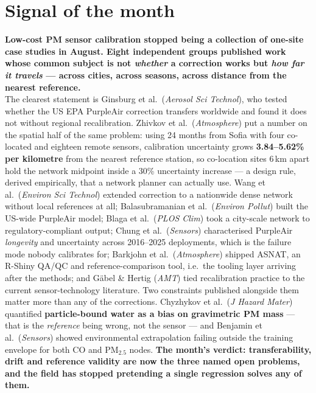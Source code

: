 \documentclass[10pt]{article}
\begin{document}
\vspace{6mm}

\section*{\sffamily\bfseries\color{Deep}Signal of the month}
\vspace{-1.5mm}{\color{Coral}\rule{\linewidth}{1.1pt}}\vspace{2.5mm}

\begin{keybox}
{\sffamily\bfseries\small\color{Deep}Low-cost PM sensor calibration stopped being a
collection of one-site case studies in August. Eight independent groups published work
whose common subject is not \emph{whether} a correction works but \emph{how far it
travels} --- across cities, across seasons, across distance from the nearest
reference.}\\[1.4mm]
\footnotesize
The clearest statement is Ginsburg et al.\ (\textit{Aerosol Sci Technol}), who tested
whether the US EPA PurpleAir correction transfers worldwide and found it does not
without regional recalibration. Zhivkov et al.\ (\textit{Atmosphere}) put a number on the
spatial half of the same problem: using 24 months from Sofia with four co-located and
eighteen remote sensors, calibration uncertainty grows \textbf{3.84--5.62\% per kilometre}
from the nearest reference station, so co-location sites 6\,km apart hold the network
midpoint inside a 30\% uncertainty increase --- a design rule, derived empirically, that a
network planner can actually use. Wang et al.\ (\textit{Environ Sci Technol}) extended
correction to a nationwide dense network without local references at all; Balasubramanian
et al.\ (\textit{Environ Pollut}) built the US-wide PurpleAir model; Blaga et al.\
(\textit{PLOS Clim}) took a city-scale network to regulatory-compliant output; Chung
et al.\ (\textit{Sensors}) characterised PurpleAir \emph{longevity} and uncertainty across
2016--2025 deployments, which is the failure mode nobody calibrates for; Barkjohn et al.\
(\textit{Atmosphere}) shipped ASNAT, an R-Shiny QA/QC and reference-comparison tool, i.e.\
the tooling layer arriving after the methods; and G\"abel \& Hertig (\textit{AMT}) tied
recalibration practice to the current sensor-technology literature.
Two constraints published alongside them matter more than any of the corrections.
Chyzhykov et al.\ (\textit{J Hazard Mater}) quantified \textbf{particle-bound water as a
bias on gravimetric PM mass} --- that is the \emph{reference} being wrong, not the sensor
--- and Benjamin et al.\ (\textit{Sensors}) showed environmental extrapolation failing
outside the training envelope for both CO and PM$_{2.5}$ nodes. \textbf{The month's
verdict: transferability, drift and reference validity are now the three named open
problems, and the field has stopped pretending a single regression solves any of them.}
\end{keybox}
\end{document}

